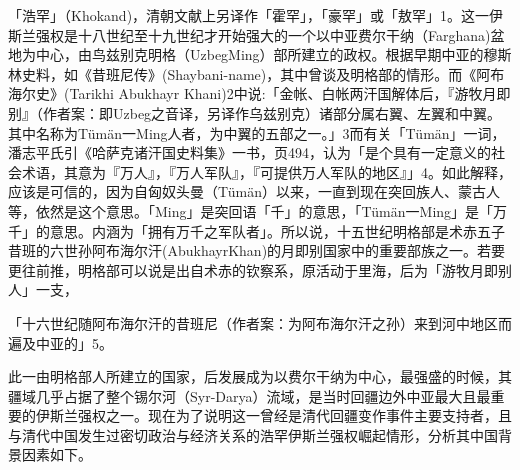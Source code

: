 
「浩罕」（Khokand)，清朝文献上另译作「霍罕」，「豪罕」或「敖罕」1。这一伊斯兰强权是十八世纪至十九世纪才开始强大的一个以中亚费尔干纳（Farghana)盆地为中心，由鸟兹别克明格（UzbegMing）部所建立的政权。根据早期中亚的穆斯林史料，如《昔班尼传》(Shaybani-name)，其中曾谈及明格部的情形。而《阿布海尔史》(Tarikhi Abukhayr Khani)2中说:「金帐、白帐两汗国解体后，『游牧月即别』（作者案：即Uzbeg之音译，另译作乌兹别克）诸部分属右翼、左翼和中翼。其中名称为Tümän一Ming人者，为中翼的五部之一。」3而有关「Tümän」一词，潘志平氏引《哈萨克诸汗国史料集》一书，页494，认为「是个具有一定意义的社会术语，其意为『万人』，『万人军队』，『可提供万人军队的地区』」4。如此解释，应该是可信的，因为自匈奴头曼（Tümän）以来，一直到现在突回族人、蒙古人等，依然是这个意思。「Ming」是突回语「千」的意思，「Tümän一Ming」是「万千」的意思。内涵为「拥有万千之军队者」。所以说，十五世纪明格部是术赤五子昔班的六世孙阿布海尔汗(AbukhayrKhan)的月即别国家中的重要部族之一。若要更往前推，明格部可以说是出自术赤的钦察系，原活动于里海，后为「游牧月即别人」一支，

\vfill
\begin{BookNotes}
\end{BookNotes}

\noindent 「十六世纪随阿布海尔汗的昔班尼（作者案：为阿布海尔汗之孙）来到河中地区而遍及中亚的」5。

此一由明格部人所建立的国家，后发展成为以费尔干纳为中心，最强盛的时候，其疆域几乎占据了整个锡尔河（Syr-Darya）流域，是当时回疆边外中亚最大且最重要的伊斯兰强权之一。现在为了说明这一曾经是清代回疆变作事件主要支持者，且与清代中国发生过密切政治与经济关系的浩罕伊斯兰强权崛起情形，分析其中国背景因素如下。

